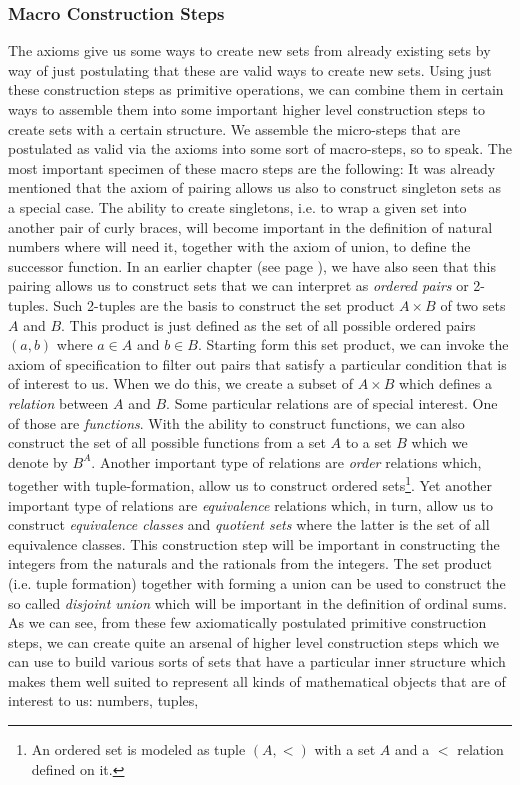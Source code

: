 \subsubsection{Macro Construction Steps}
The axioms give us some ways to create new sets from already existing sets by way of just postulating that these are valid ways to create new sets. Using just these construction steps as primitive operations, we can combine them in certain ways to assemble them into some important higher level construction steps to create sets with a certain structure. We assemble the micro-steps that are postulated as valid via the axioms into some sort of macro-steps, so to speak. The most important specimen of these macro steps are the following: It was already mentioned that the axiom of pairing allows us also to construct singleton sets as a special case. The ability to create singletons, i.e. to wrap a given set into another pair of curly braces, will become important in the definition of natural numbers where will need it, together with the axiom of union, to define the successor function. In an earlier chapter (see page \pageref{Sec:KuratowskiPair}), we have also seen that this pairing allows us to construct sets that we can interpret as \emph{ordered pairs} or 2-tuples. Such 2-tuples are the basis to construct the set product $A \times B$ of two sets $A$ and $B$. This product is just defined as the set of all possible ordered pairs $(a,b)$ where $a \in A$ and $b \in B$. Starting form this set product, we can invoke the axiom of specification to filter out pairs that satisfy a particular condition that is of interest to us. When we do this, we create a subset of $A \times B$ which defines a \emph{relation} between $A$ and $B$. Some particular relations are of special interest. One of those are \emph{functions}. With the ability to construct functions, we can also construct the set of all possible functions from a set $A$ to a set $B$ which we denote by $B^A$. Another important type of relations are \emph{order} relations which, together with tuple-formation, allow us to construct ordered sets\footnote{An ordered set is modeled as tuple $(A,<)$ with a set $A$ and a $<$ relation defined on it.}. Yet another important type of relations are \emph{equivalence} relations which, in turn, allow us to construct \emph{equivalence classes} and \emph{quotient sets} where the latter is the set of all equivalence classes. This construction step will be important in constructing the integers from the naturals and the rationals from the integers. The set product (i.e. tuple formation) together with forming a union can be used to construct the so called \emph{disjoint union} which will be important in the definition of ordinal sums. As we can see, from these few axiomatically postulated primitive construction steps, we can create quite an arsenal of higher level construction steps which we can use to build various sorts of sets that have a particular inner structure which makes them well suited to represent all kinds of mathematical objects that are of interest to us: numbers, tuples, 